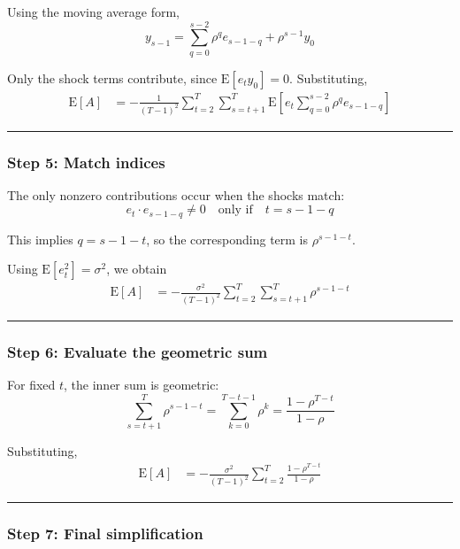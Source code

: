\documentclass[11pt]{article}
\begin{document}
Using the moving average form, \[
y_{s-1} = \sum_{q=0}^{s-2}\rho^q e_{s-1-q} + \rho^{s-1}y_0
\]

Only the shock terms contribute, since \(\text{E}[e_t y_0] = 0\).
Substituting, \[
\begin{aligned}
\text{E}[A]
&= -\frac{1}{(T-1)^2}\sum_{t=2}^{T}\sum_{s=t+1}^{T}
\text{E}\left[e_t \sum_{q=0}^{s-2}\rho^q e_{s-1-q}\right]
\end{aligned}
\]

\begin{center}\rule{0.5\linewidth}{0.5pt}\end{center}

\subsubsection{Step 5: Match indices}\label{step-5-match-indices}

The only nonzero contributions occur when the shocks match: \[
e_t \cdot e_{s-1-q} \neq 0 \quad \text{only if} \quad t = s-1-q
\]

This implies \(q = s-1-t\), so the corresponding term is
\(\rho^{s-1-t}\).

Using \(\text{E}[e_t^2] = \sigma^2\), we obtain \[
\begin{aligned}
\text{E}[A]
&= -\frac{\sigma^2}{(T-1)^2}\sum_{t=2}^{T}\sum_{s=t+1}^{T} \rho^{s-1-t}
\end{aligned}
\]

\begin{center}\rule{0.5\linewidth}{0.5pt}\end{center}

\subsubsection{Step 6: Evaluate the geometric
sum}\label{step-6-evaluate-the-geometric-sum}

For fixed \(t\), the inner sum is geometric: \[
\sum_{s=t+1}^{T} \rho^{s-1-t}
= \sum_{k=0}^{T-t-1} \rho^k
= \frac{1-\rho^{T-t}}{1-\rho}
\]

Substituting, \[
\begin{aligned}
\text{E}[A]
&= -\frac{\sigma^2}{(T-1)^2}\sum_{t=2}^{T} \frac{1-\rho^{T-t}}{1-\rho}
\end{aligned}
\]

\begin{center}\rule{0.5\linewidth}{0.5pt}\end{center}

\subsubsection{Step 7: Final
simplification}\label{step-7-final-simplification}
\end{document}
